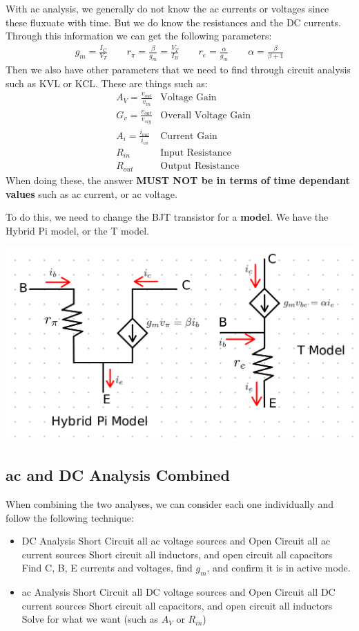 \documentclass[12pt,letterpaper]{article} \usepackage{amsmath} \usepackage{graphicx} \usepackage[margin=1in]{geometry} \usepackage{longtable}  \usepackage{amssymb}
\begin{document}
	With ac analysis, we generally do not know the ac currents or voltages since these fluxuate with time. But we do know the resistances and the DC currents. Through this information we can get the following parameters:
	\begin{align*}
		g_m = \frac{I_C}{V_T} \qquad r_\pi  =\frac{\beta}{g_m} = \frac{V_T}{I_B} \qquad r_e = \frac{\alpha}{g_m}\qquad \alpha = \frac{\beta}{\beta+1}
	\end{align*}
	Then we also have other parameters that we need to find through circuit analysis such as KVL or KCL. These are things such as:
	\begin{align*}
		&A_V = \frac{v_{out}}{v_{in}}&\text{Voltage Gain}\\
		&G_v = \frac{v_{out}}{v_{sig}}&\text{Overall Voltage Gain}\\
		&A_i = \frac{i_{out}}{i_{in}}&\text{Current Gain}\\
		&R_{in} &\text{Input Resistance}\\
		&R_{out}&\text{Output Resistance} 
	\end{align*}
	When doing these, the answer \textbf{MUST NOT be in terms of time dependant values} such as ac current, or ac voltage.
	
	To do this, we need to change the BJT transistor for a \textbf{model}. We have the Hybrid Pi model, or the T model. 
	\begin{center}
		\includegraphics[width=0.8\linewidth]{hybridpi-tmodel}
	\end{center}
	
	\subsection{ac and DC Analysis Combined}
	When combining the two analyses, we can consider each one individually and follow the following technique:
	\begin{itemize}
		\item DC Analysis
		\subitem Short Circuit all ac voltage sources and Open Circuit all ac current sources
		\subitem Short circuit all inductors, and open circuit all capacitors
		\subitem Find C, B, E currents and voltages, find $g_m$, and confirm it is in active mode.
		\item ac Analysis
		\subitem Short Circuit all DC voltage sources and Open Circuit all DC current sources
		\subitem Short circuit all capacitors, and open circuit all inductors
		\subitem Solve for what we want (such as $A_V$ or $R_{in}$)
	\end{itemize}
\end{document}
